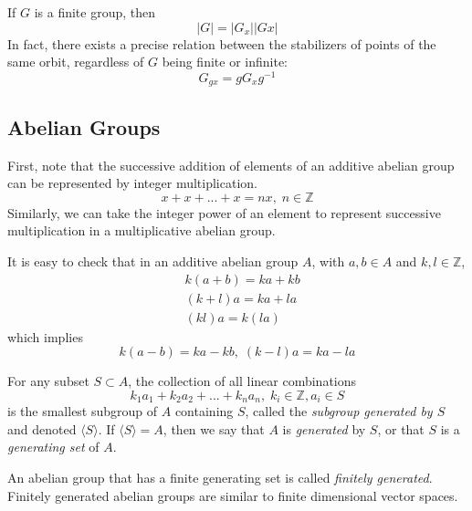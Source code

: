 \documentclass{article}
\begin{document}
  \begin{corollary}
    If $G$ is a finite group, then 
    \[ |G| = |G_x| |G x| \]
    In fact, there exists a precise relation between the stabilizers of points of the same orbit, regardless of $G$ being finite or infinite: 
    \[ G_{g x} = g G_{x} g^{-1} \]
  \end{corollary}

\subsection{Abelian Groups}

  First, note that the successive addition of elements of an additive abelian group can be represented by integer multiplication. 
  \begin{equation}
    x + x + ... + x = n x, \; n \in \mathbb{Z}
  \end{equation}
  Similarly, we can take the integer power of an element to represent successive multiplication in a multiplicative abelian group. 

  \begin{proposition}
    It is easy to check that in an additive abelian group $A$, with $a, b \in A$ and $k, l \in \mathbb{Z}$, 
    \begin{align}
      & k (a + b) = k a + k b \\
      & (k + l) a = k a + l a \\
      & (k l) a = k (l a)
    \end{align}
    which implies
    \begin{equation}
        k(a - b) = k a - k b, \; (k - l) a = k a - l a
    \end{equation}
  \end{proposition}

  \begin{definition}
    For any subset $S \subset A$, the collection of all linear combinations 
    \begin{equation}
      k_1 a_1 + k_2 a_2 + ... + k_n a_n, \; k_i \in \mathbb{Z}, a_i \in S
    \end{equation}
    is the smallest subgroup of $A$ containing $S$, called the \textit{subgroup generated by $S$} and denoted $\langle S \rangle$. If $\langle S \rangle = A$, then we say that $A$ is \textit{generated} by $S$, or that $S$ is a \textit{generating set} of $A$. 
  \end{definition}

  \begin{definition}
    An abelian group that has a finite generating set is called \textit{finitely generated}. Finitely generated abelian groups are similar to finite dimensional vector spaces. 
  \end{definition}
\end{document}

